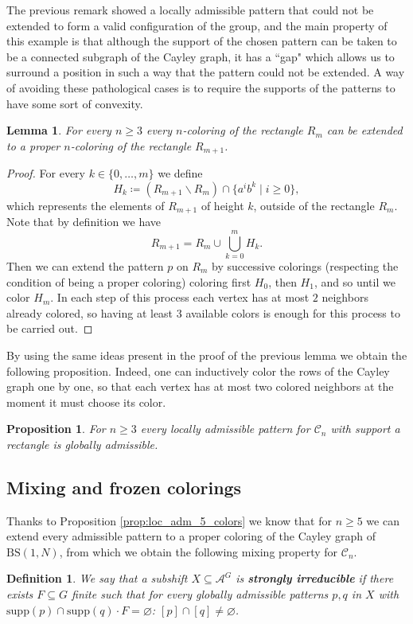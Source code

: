 \documentclass[letterpaper,10pt]{amsart}
\theoremstyle{plain}
\newtheorem{definition}{Definition}[section]
\newtheorem{lemma}[theorem]{Lemma}
\newtheorem{proposition}[theorem]{Proposition}
\newcommand{\BS}[1][N]{\mathrm{BS}(1,#1)}
\begin{document}
	The previous remark showed a locally admissible pattern that could not be extended to form a valid configuration of the group, and the main property of this example is that although the support of the chosen pattern can be taken to be a connected subgraph of the Cayley graph, it has a ``gap" which allows us to surround a position in such a way that the pattern could not be extended. A way of avoiding these pathological cases is to require the supports of the patterns to have some sort of convexity.
	\begin{lemma} \label{lem:gcs_extend_to_rectangles} For every $n\ge 3$ every $n$-coloring of the rectangle $R_m$ can be extended to a proper $n$-coloring of the rectangle $R_{m+1}$.
	\end{lemma}
	\begin{proof}
		For every $k\in \{0,\ldots,m\}$ we define $$H_k\coloneqq \left(R_{m+1}\backslash R_{m}\right)\cap \{a^ib^k\mid i\ge 0\},$$
		which represents the elements of $R_{m+1}$ of height $k$, outside of the rectangle $R_m$. Note that by definition we have $$R_{m+1}=R_m\cup \bigcup_{k=0}^{m}H_k.$$ Then we can extend the pattern $p$ on $R_m$ by successive colorings (respecting the condition of being a proper coloring) coloring first $H_0$, then $H_1$, and so until we color $H_m$. In each step of this process each vertex has at most $2$ neighbors already colored, so having at least $3$ available colors is enough for this process to be carried out. 
	\end{proof}
	By using the same ideas present in the proof of the previous lemma we obtain the following proposition. Indeed, one can inductively color the rows of the Cayley graph one by one, so that each vertex has at most two colored neighbors at the moment it must choose its color. 
	\begin{proposition}\label{prop:gcs_rectangle_extension} For $n\ge 3$ every locally admissible pattern for $\mathcal{C}_n$ with support a rectangle is globally admissible.
	\end{proposition}

	
	
	\subsection{Mixing and frozen colorings}\label{subsection:mixing_and frozen}
Thanks to Proposition \ref{prop:loc_adm_5_colors} we know that for $n\ge 5$ we can extend every admissible pattern to a proper coloring of the Cayley graph of $\BS$, from which we obtain the following mixing property for $\mathcal{C}_n$.
\begin{definition} We say that a subshift $X\subseteq \mathcal{A}^G$ is \textbf{strongly irreducible} if there exists $F\subseteq G$ finite such that for every globally admissible patterns $p,q$ in $X$ with $\mathrm{supp}(p)\cap \mathrm{supp}(q)\cdot F=\varnothing$: $[p]\cap [q]\neq \varnothing$.
\end{definition}
\end{document}
